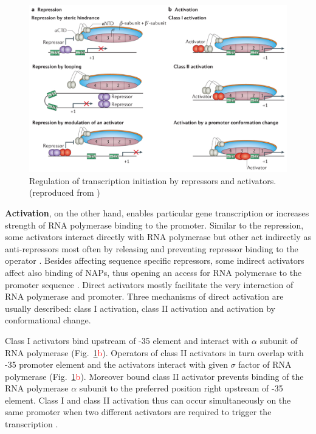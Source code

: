 \begin{figure}[ht!]
  \centering
  \includegraphics[scale=0.4]{text/Pictures/TxnInitRegulation.png}
	\caption{Regulation of transcription initiation by repressors and activators. (reproduced from \cite{browning2016local})}
	\label{txn}
\end{figure}

\textbf{Activation}, on the other hand, enables particular gene transcription or increases strength of RNA polymerase binding to the promoter.
Similar to the repression, some activators interact directly with RNA polymerase but other act indirectly as anti-repressors most often by releasing and preventing repressor binding to the operator \cite{frederix2011co}.
Besides affecting sequence specific repressors, some indirect activators affect also binding of NAPs, thus opening an access for RNA polymerase to the promoter sequence \cite{santana2001transcriptional}.
Direct activators mostly facilitate the very interaction of RNA polymerase and promoter.
Three mechanisms of direct activation are usually described: class I activation, class II activation and activation by conformational change.

Class I activators bind upstream of -35 element and interact with $\alpha$ subunit of RNA polymerase \cite{ushida1990helical} (Fig.~\ref{txn}\textcolor{red}{b}).
Operators of class II activators in turn overlap with -35 promoter element and the activators interact with given $\sigma$ factor of RNA polymerase \cite{igarashi1991functional} (Fig.~\ref{txn}\textcolor{red}{b}).
Moreover bound class II activator prevents binding of the RNA polymerase $\alpha$ subunit to the preferred position right upstream of -35 element.
Class I and class II activation thus can occur simultaneously on the same promoter when two different activators are required to trigger the transcription \cite{lloyd2002requirement}.

